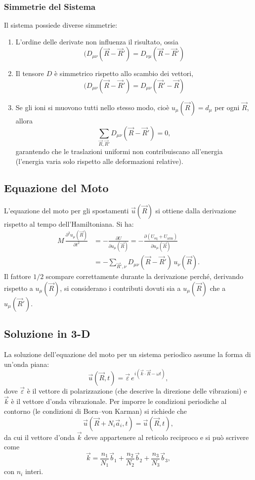 \subsubsection*{Simmetrie del Sistema}
Il sistema possiede diverse simmetrie:
\begin{enumerate}
    \item L'ordine delle derivate non influenza il risultato, ossia 
    \[(D_{\mu\nu}(\vec{R}-\vec{R}') = D_{\nu\mu}(\vec{R}-\vec{R}')\]
    \item Il tensore \(D\) è simmetrico rispetto allo scambio dei vettori,
     \[(D_{\mu\nu}(\vec{R}-\vec{R}') = D_{\mu\nu}(\vec{R}'-\vec{R})\] 
    \item Se gli ioni si muovono tutti nello stesso modo, cioè \(u_{\mu}(\vec{R}) = d_{\mu}\) per ogni \(\vec{R}\), allora
    \[
    \sum_{\vec{R},\vec{R}'} D_{\mu\nu}(\vec{R}-\vec{R}') = 0,
    \]
    garantendo che le traslazioni uniformi non contribuiscano all'energia (l'energia varia solo rispetto alle deformazioni relative).
\end{enumerate}

\subsection{Equazione del Moto}
L'equazione del moto per gli spostamenti \(\vec{u}(\vec{R})\) si ottiene dalla derivazione rispetto al tempo dell'Hamiltoniana. Si ha:
\begin{equation}
\begin{split}
    M\, \frac{\partial^2 u_{\mu}(\vec{R})}{\partial t^2} &= -\frac{\partial U}{\partial u_{\mu}(\vec{R})} = -\frac{\partial (U_{\text{eq}}+U_{\text{arm}})}{\partial u_{\mu}(\vec{R})} \\
    &= -\sum_{\vec{R}',\nu} D_{\mu\nu}(\vec{R}-\vec{R}')\, u_{\nu}(\vec{R}).
\end{split}
\end{equation}
Il fattore \(1/2\) scompare correttamente durante la derivazione perché, derivando rispetto a \(u_{\mu}(\vec{R})\), si considerano i contributi dovuti sia a \(u_{\mu}(\vec{R})\) che a \(u_{\mu}(\vec{R}')\).

\subsection{Soluzione in 3-D}
La soluzione dell'equazione del moto per un sistema periodico assume la forma di un'onda piana:
\[
\vec{u}(\vec{R},t) = \vec{\varepsilon}\, e^{i(\vec{k}\cdot\vec{R}-\omega t)},
\]
dove \(\vec{\varepsilon}\) è il vettore di polarizzazione (che descrive la direzione delle vibrazioni) e \(\vec{k}\) è il vettore d'onda vibrazionale. Per imporre le condizioni periodiche al contorno (le condizioni di Born--von Karman) si richiede che
\[
\vec{u}(\vec{R}+N_i\vec{a}_i,t) = \vec{u}(\vec{R},t),
\]
da cui il vettore d'onda \(\vec{k}\) deve appartenere al reticolo reciproco e si può scrivere come
\[
\vec{k} = \frac{n_1}{N_1}\vec{b}_1 + \frac{n_2}{N_2}\vec{b}_2 + \frac{n_3}{N_3}\vec{b}_3,
\]
con \(n_i\) interi.

